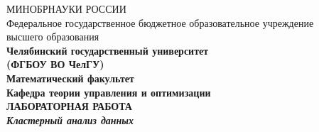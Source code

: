 \documentclass[12pt,a4paper,titlepage]{article}
\begin{document}
\begin{titlepage}
\begin{center}
  МИНОБРНАУКИ РОССИИ\\
  Федеральное государственное бюджетное образовательное учреждение\\ высшего образования\\

\bfseries \flqq Челябинский государственный университет\frqq \\
\bfseries (ФГБОУ ВО \flqq ЧелГУ\frqq) \\[0.7cm]

Математический факультет\\
Кафедра теории управления и оптимизации\\[3.4cm]
\large\bfseries ЛАБОРАТОРНАЯ РАБОТА\\[1cm]
\textit{\large\bfseries{Кластерный анализ данных\\[2cm]}}


\end{center}
\end{titlepage}
\end{document}
